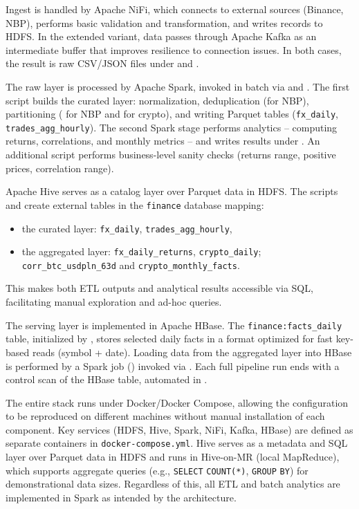 \documentclass{article}
\begin{document}
Ingest is handled by Apache NiFi, which connects to external sources
(Binance, NBP), performs basic validation and transformation, and writes
records to HDFS. In the extended variant, data passes through Apache
Kafka as an intermediate buffer that improves resilience to connection
issues. In both cases, the result is raw CSV/JSON files under
 and
.

The raw layer is processed by Apache Spark, invoked in batch via
 and . The first
script builds the curated layer: normalization, deduplication (for NBP),
partitioning ( for NBP and  for crypto),
and writing Parquet tables (\texttt{fx\_daily},
\texttt{trades\_agg\_hourly}). The second Spark stage performs analytics
-- computing returns, correlations, and monthly metrics -- and writes
results under . An additional script
 performs business-level sanity checks
(returns range, positive prices, correlation range).

Apache Hive serves as a catalog layer over Parquet data in HDFS. The
scripts  and  create
external tables in the \texttt{finance} database mapping:
\begin{itemize}
\item the curated layer: \texttt{fx\_daily}, \texttt{trades\_agg\_hourly},
\item the aggregated layer: \texttt{fx\_daily\_returns},
  \texttt{crypto\_daily};\\
  \texttt{corr\_btc\_usdpln\_63d} and \texttt{crypto\_monthly\_facts}.
\end{itemize}
This makes both ETL outputs and analytical results accessible via SQL,
facilitating manual exploration and ad-hoc queries.

The serving layer is implemented in Apache HBase. The
\texttt{finance:facts\_daily} table, initialized by
, stores selected daily facts in a format
optimized for fast key-based reads (symbol + date). Loading data from the
aggregated layer into HBase is performed by a Spark job
() invoked via
. Each full pipeline run ends with a control
scan of the HBase table, automated in
.

The entire stack runs under Docker/Docker Compose, allowing the
configuration to be reproduced on different machines without manual
installation of each component. Key services (HDFS, Hive, Spark, NiFi,
Kafka, HBase) are defined as separate containers in
\texttt{docker-compose.yml}. Hive serves as a metadata and SQL layer over
Parquet data in HDFS and runs in Hive-on-MR (local MapReduce), which
supports aggregate queries (e.g., \texttt{SELECT} \texttt{COUNT(*)},
\texttt{GROUP} \texttt{BY}) for demonstrational data sizes. Regardless of
this, all ETL and batch analytics are implemented in Spark as intended by
the architecture.
\end{document}
